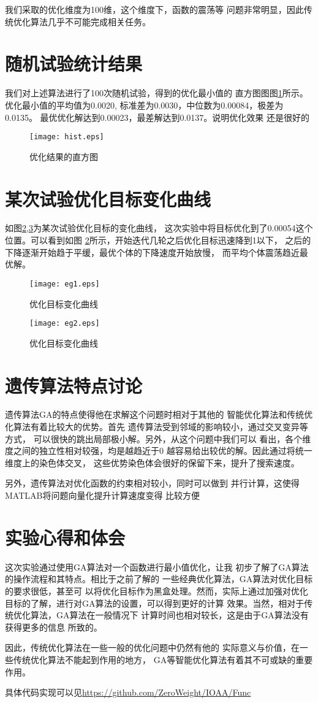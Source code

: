 \documentclass[UTF8,a4paper]{paper}
\begin{document}
我们采取的优化维度为100维，这个维度下，函数的震荡等
问题非常明显，因此传统优化算法几乎不可能完成相关任务。
\section{随机试验统计结果}
我们对上述算法进行了100次随机试验，得到的优化最小值的
直方图图图\ref{hist}所示。优化最小值的平均值为0.0020,
标准差为0.0030，中位数为0.00084，极差为0.0135。
最优优化解达到0.00023，最差解达到0.0137。说明优化效果
还是很好的
\begin{figure}
\centering
\texttt{[image: hist.eps]}
\caption{优化结果的直方图}
\label{hist}
\end{figure}
\section{某次试验优化目标变化曲线}
如图\ref{eg1},\ref{eg2}为某次试验优化目标的变化曲线，
这次实验中将目标优化到了0.00054这个位置。可以看到如图
\ref{eg1}所示，开始迭代几轮之后优化目标迅速降到1以下，
之后的下降逐渐开始趋于平缓，最优个体的下降速度开始放慢，
而平均个体震荡趋近最优解。
\begin{multicols}{2}
\begin{figure}[H]
\texttt{[image: eg1.eps]}
\caption{优化目标变化曲线}
\label{eg1}
\end{figure}
\begin{figure}[H]
\texttt{[image: eg2.eps]}
\caption{优化目标变化曲线}
\label{eg2}
\end{figure}
\end{multicols}
\section{遗传算法特点讨论}
遗传算法GA的特点使得他在求解这个问题时相对于其他的
智能优化算法和传统优化算法有着比较大的优势。首先
遗传算法受到邻域的影响较小，通过交叉变异等方式，
可以很快的跳出局部极小解。另外，从这个问题中我们可以
看出，各个维度之间的独立性相对较强，均是越趋近于0
越容易给出较优的解。因此通过将统一维度上的染色体交叉，
这些优势染色体会很好的保留下来，提升了搜索速度。

另外，遗传算法对优化函数的约束相对较小，同时可以做到
并行计算，这使得MATLAB将问题向量化提升计算速度变得
比较方便
\section{实验心得和体会}
这次实验通过使用GA算法对一个函数进行最小值优化，让我
初步了解了GA算法的操作流程和其特点。相比于之前了解的
一些经典优化算法，GA算法对优化目标的要求很低，甚至可
以将优化目标作为黑盒处理。然而，实际上通过加强对优化
目标的了解，进行对GA算法的设置，可以得到更好的计算
效果。当然，相对于传统优化算法，GA算法在一般情况下
计算时间也相对较长，这是由于GA算法没有获得更多的信息
所致的。

因此，传统优化算法在一些一般的优化问题中仍然有他的
实际意义与价值，在一些传统优化算法不能起到作用的地方，
GA等智能优化算法有着其不可或缺的重要作用。

具体代码实现可以见\url{https://github.com/ZeroWeight/IOAA/Func}
\end{document}
